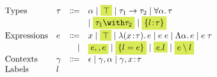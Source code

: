 \[
\begin{array}{l}
  \begin{array}{llrl}
    \text{Types} 
    & \tau & \Coloneqq & \alpha \mid \highlight{\top} \mid \tau_1 \to \tau_2 \mid \for \alpha \tau \\
    &      &           & \mid \highlight{\tau_1 \andop \tau_2} \mid \highlight{\recty l \tau} \\
    \text{Expressions} 
    & e & \Coloneqq & x \mid \highlight{\top} \mid \lam x \tau e \mid \app e e \mid \blam \alpha e \mid \tapp e \tau \\
    &   & \mid      & \highlight {e \mergeop e} \mid \highlight {\reccon l e} \mid
                      \highlight {e.l} \mid \highlight{e \restrictop l} \\
    \text{Contexts} 
    & \gamma & \Coloneqq & \epsilon \mid \gamma, \alpha \mid \gamma, x \hast \tau \\
    \text{Labels} & l
  \end{array} 
\end{array}
\]
